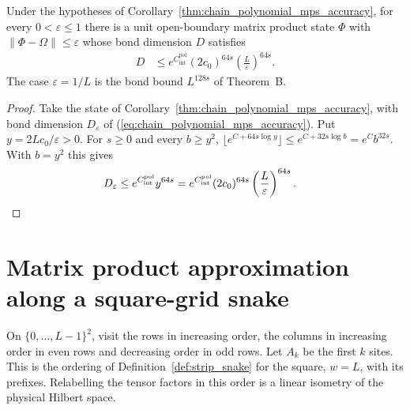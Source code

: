 \begin{corollary}
    \label{thm:chain_polynomial_mps_accuracy_bound}
    \leanok
    Under the hypotheses of Corollary~\ref{thm:chain_polynomial_mps_accuracy},
    for every $0<\varepsilon\le1$ there is a unit open-boundary matrix
    product state $\Phi$ with $\|\Phi-\Omega\|\le\varepsilon$ whose bond
    dimension $D$ satisfies
    \begin{align}
        D & \le e^{C_{\mathrm{int}}^{\mathrm{pol}}}(2c_0)^{64s}
        \left(\frac{L}{\varepsilon}\right)^{64s}.
        \label{eq:chain_polynomial_mps_accuracy_bound}
    \end{align}
    The case $\varepsilon=1/L$ is the bond bound $L^{128s}$ of Theorem~B.
\end{corollary}
\begin{proof}
    \leanok
    Take the state of Corollary~\ref{thm:chain_polynomial_mps_accuracy}, with
    bond dimension $D_\varepsilon$ of
    (\ref{eq:chain_polynomial_mps_accuracy}). Put $y=2Lc_0/\varepsilon>0$.
    For $s\ge0$ and every $b\ge y^2$,
    $\lfloor e^{C+64s\log y}\rfloor\le e^{C+32s\log b}=e^Cb^{32s}$.
    With $b=y^2$ this gives
    \begin{align}
        D_\varepsilon & \le e^{C_{\mathrm{int}}^{\mathrm{pol}}}y^{64s}
        =e^{C_{\mathrm{int}}^{\mathrm{pol}}}(2c_0)^{64s}
        \left(\frac{L}{\varepsilon}\right)^{64s}.\notag
    \end{align}
\end{proof}


\section{Matrix product approximation along a square-grid snake}

\begin{definition}
    \label{def:snake_grid_order}
    \leanok
    On $\{0,\ldots,L-1\}^2$, visit the rows in increasing order, the
    columns in increasing order in even rows and decreasing order in odd
    rows. Let $A_k$ be the first $k$ sites. This is the ordering of
    Definition~\ref{def:strip_snake} for the square, $w=L$, with its
    prefixes. Relabelling the tensor factors
    in this order is a linear isometry of the physical Hilbert space.
\end{definition}

